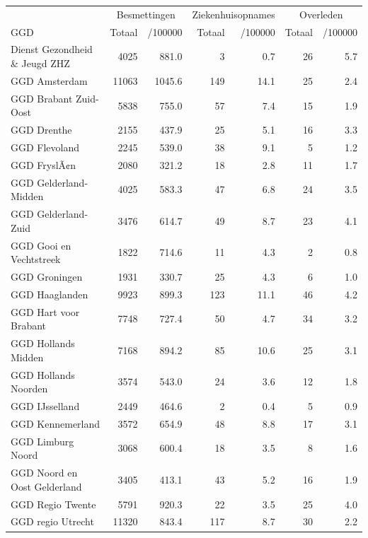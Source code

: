 \documentclass[
  english,
  man,floatsintext]{apa6}
\begin{document}
\begin{table}[H]
\centering\begingroup\fontsize{10}{12}\selectfont

\begin{threeparttable}
\begin{tabular}{lrrrrrr}
\toprule
\multicolumn{1}{c}{ } & \multicolumn{2}{c}{Besmettingen} & \multicolumn{2}{c}{Ziekenhuisopnames} & \multicolumn{2}{c}{Overleden} \\
\cmidrule(l{3pt}r{3pt}){2-3} \cmidrule(l{3pt}r{3pt}){4-5} \cmidrule(l{3pt}r{3pt}){6-7}
GGD & Totaal & /100000 & Totaal & /100000 & Totaal & /100000\\
\midrule
Dienst Gezondheid \& Jeugd ZHZ & 4025 & 881.0 & 3 & 0.7 & 26 & 5.7\\
GGD Amsterdam & 11063 & 1045.6 & 149 & 14.1 & 25 & 2.4\\
GGD Brabant Zuid-Oost & 5838 & 755.0 & 57 & 7.4 & 15 & 1.9\\
GGD Drenthe & 2155 & 437.9 & 25 & 5.1 & 16 & 3.3\\
GGD Flevoland & 2245 & 539.0 & 38 & 9.1 & 5 & 1.2\\
GGD FryslÃ¢n & 2080 & 321.2 & 18 & 2.8 & 11 & 1.7\\
GGD Gelderland-Midden & 4025 & 583.3 & 47 & 6.8 & 24 & 3.5\\
GGD Gelderland-Zuid & 3476 & 614.7 & 49 & 8.7 & 23 & 4.1\\
GGD Gooi en Vechtstreek & 1822 & 714.6 & 11 & 4.3 & 2 & 0.8\\
GGD Groningen & 1931 & 330.7 & 25 & 4.3 & 6 & 1.0\\
GGD Haaglanden & 9923 & 899.3 & 123 & 11.1 & 46 & 4.2\\
GGD Hart voor Brabant & 7748 & 727.4 & 50 & 4.7 & 34 & 3.2\\
GGD Hollands Midden & 7168 & 894.2 & 85 & 10.6 & 25 & 3.1\\
GGD Hollands Noorden & 3574 & 543.0 & 24 & 3.6 & 12 & 1.8\\
GGD IJsselland & 2449 & 464.6 & 2 & 0.4 & 5 & 0.9\\
GGD Kennemerland & 3572 & 654.9 & 48 & 8.8 & 17 & 3.1\\
GGD Limburg Noord & 3068 & 600.4 & 18 & 3.5 & 8 & 1.6\\
GGD Noord en Oost Gelderland & 3405 & 413.1 & 43 & 5.2 & 16 & 1.9\\
GGD Regio Twente & 5791 & 920.3 & 22 & 3.5 & 25 & 4.0\\
GGD regio Utrecht & 11320 & 843.4 & 117 & 8.7 & 30 & 2.2\\

\end{tabular}
\end{threeparttable}
\end{table}
\end{document}
